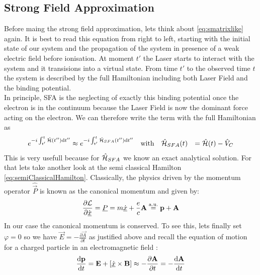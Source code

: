 \subsection{Strong Field Approximation}
Before maing the strong field approximation, lets think about \eqref{eq:smatrixlike} again.
It is best to read this equation from right to left, starting with the initial state of our system and the propagation of the system in presence of a weak electric field before ionisation. 
At moment $t'$ the Laser starts to interact with the system and it transisions into a virtual state. 
From time $t'$ to the observed time $t$ the system is described by the full Hamiltonian including both Laser Field and the binding potential.\\
In principle, SFA is the neglecting of exactly this binding potential once the electron is in the continuum because the Laser Field is now the dominant force acting on the electron.
We can therefore write the term with the full Hamiltonian as
\begin{equation*}
    \begin{aligned}
        e^{-i \int_{t'}^{t} \hat{\mathcal{H}}(t'') \mathrm{d} t''} &\approx e^{-i \int_{t'}^{t} \hat{\mathcal{H}}_{SFA}(t'') \mathrm{d} t''} \quad \text{with} \quad \hat{\mathcal{H}}_{SFA}(t) &= \hat{\mathcal{H}}(t) - \hat{V}_C
    \end{aligned}
\end{equation*}
This is very usefull because for $\hat{\mathcal{H}}_{SFA}$ we know an exact analytical solution. For that lets take another look at the semi classical Hamilton \eqref{eq:semiClassicalHamilton}. 
Classically, the physics driven by the momentum operator $\hat{\vec{P}}$ is known as the canonical momentum and given by:
\begin{equation*}
    \frac{\partial \mathcal{L}}{\partial \dot{\underline{x}}} = \underline{P} = m\underline{\dot{x}} + \frac{e}{c}\mathbf{A} \stackrel{\mathrm{a.u.}}{=} \mathbf{p} + \mathbf{A}
\end{equation*}
In our case the canonical momentum is conserved. To see this, lets finally set $\varphi=0$ so we have $\vec{E} = -\frac{\partial \vec{A}}{\partial t}$ as justified above and recall the equation of motion for a charged particle in an electromagnetic field \cite{LandauLifschitzBand2}:
\begin{equation*}
    \frac{\dd\vec{p}}{\dd t} = \vec{E} + \left[\uvec{\dot{x}}\times\vec{B}\right] \approx -\frac{\partial \vec{A}}{\partial t} = -\frac{\dd \vec{A}}{\dd t}   %
\end{equation*}

